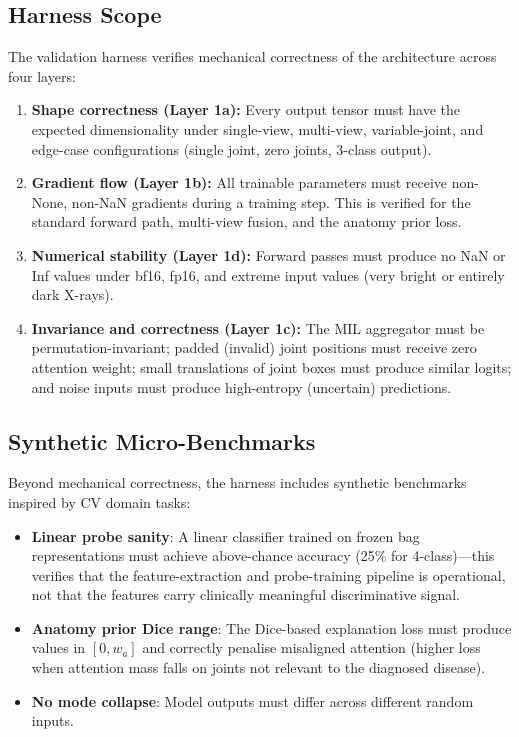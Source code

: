 \documentclass{article}
\begin{document}
\subsection{Harness Scope}
The validation harness verifies mechanical correctness of the architecture across four layers:
\begin{enumerate}
  \item \textbf{Shape correctness (Layer 1a):} Every output tensor must have the expected dimensionality under single-view, multi-view, variable-joint, and edge-case configurations (single joint, zero joints, 3-class output).
  \item \textbf{Gradient flow (Layer 1b):} All trainable parameters must receive non-None, non-NaN gradients during a training step. This is verified for the standard forward path, multi-view fusion, and the anatomy prior loss.
  \item \textbf{Numerical stability (Layer 1d):} Forward passes must produce no NaN or Inf values under bf16, fp16, and extreme input values (very bright or entirely dark X-rays).
  \item \textbf{Invariance and correctness (Layer 1c):} The MIL aggregator must be permutation-invariant; padded (invalid) joint positions must receive zero attention weight; small translations of joint boxes must produce similar logits; and noise inputs must produce high-entropy (uncertain) predictions.
\end{enumerate}

\subsection{Synthetic Micro-Benchmarks}
Beyond mechanical correctness, the harness includes synthetic benchmarks inspired by CV domain tasks:
\begin{itemize}
  \item \textbf{Linear probe sanity}: A linear classifier trained on frozen bag representations must achieve above-chance accuracy (25\% for 4-class)---this verifies that the feature-extraction and probe-training pipeline is operational, not that the features carry clinically meaningful discriminative signal.
  \item \textbf{Anatomy prior Dice range}: The Dice-based explanation loss must produce values in $[0, w_a]$ and correctly penalise misaligned attention (higher loss when attention mass falls on joints not relevant to the diagnosed disease).
  \item \textbf{No mode collapse}: Model outputs must differ across different random inputs.
\end{itemize}
\end{document}
